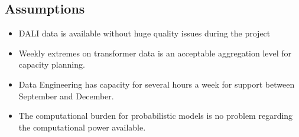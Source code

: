 \documentclass[letterpaper,10pt,english]{sphinxmanual}
\begin{document}
\subsection{Assumptions}
\label{\detokenize{business_understanding:assumptions}}\begin{itemize}
\item {} 
DALI data is available without huge quality issues during the project

\item {} 
Weekly extremes on transformer data is an acceptable aggregation level for capacity planning.

\item {} 
Data Engineering has capacity for several hours a week for support between September and December.

\item {} 
The computational burden for probabilistic models is no problem regarding the computational power available.

\end{itemize}
\end{document}
